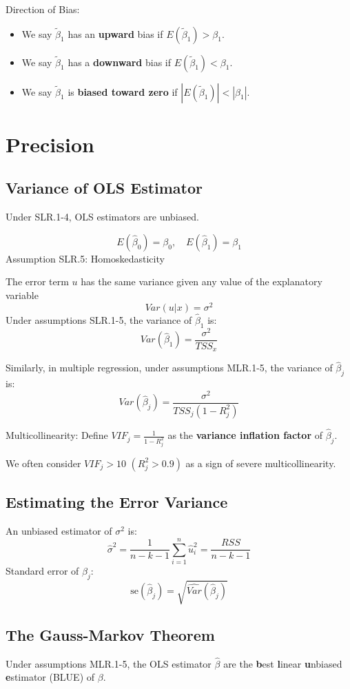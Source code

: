 \documentclass[11pt,a4paper]{article}
\begin{document}
Direction of Bias:
\begin{itemize}
    \item We say $\tilde{\beta}_1$ has an \textbf{upward} bias if $E(\tilde{\beta}_1) > \beta_1$.
    \item We say $\tilde{\beta}_1$ has a \textbf{downward} bias if $E(\tilde{\beta}_1) < \beta_1$.
    \item We say $\tilde{\beta}_1$ is \textbf{biased toward zero} if $|E(\tilde{\beta}_1)| < |\beta_1|$.
\end{itemize}

\section{Precision}
\subsection{Variance of OLS Estimator}
Under SLR.1-4, OLS estimators are unbiased. \par
\[
E(\hat{\beta}_0) = \beta_0, \quad E(\hat{\beta}_1) = \beta_1
\]
Assumption SLR.5: Homoskedasticity \par
The error term $u$ has the same variance given any value of the explanatory variable
\[
Var(u|x) = \sigma^2
\]
Under assumptions SLR.1-5, the variance of $\hat{\beta}_1$ is:
\[
Var(\hat{\beta}_1) = \frac{\sigma^2}{TSS_x}
\]

Similarly, in multiple regression, under assumptions MLR.1-5, the variance of $\hat{\beta}_j$ is:
\[
Var(\hat{\beta}_j) = \frac{\sigma^2}{TSS_j (1 - R_j^2)}
\]

Multicollinearity:
Define $VIF_j = \frac{1}{1 - R_j^2}$ as the \textbf{variance inflation factor} of $\hat{\beta}_j$. \par
We often consider $VIF_j > 10$  $(R_j^2 > 0.9)$ as a sign of severe multicollinearity.

\subsection{Estimating the Error Variance}
An unbiased estimator of $\sigma^2$ is:
\[
\hat{\sigma}^2 = \frac{1}{n-k-1} \sum_{i=1}^n \hat{u}_i^2 = \frac{RSS}{n-k-1}
\]
Standard error of $\hat{\beta}_j$:
\[
\text{se}(\hat{\beta}_j) = \sqrt{\widehat{Var}(\hat{\beta}_j)}
\]

\subsection{The Gauss-Markov Theorem}
Under assumptions MLR.1-5, the OLS estimator $\hat{\beta}$ are the \textbf{b}est \textbf{l}inear \textbf{u}nbiased \textbf{e}stimator (BLUE) of $\beta$. \par
\end{document}
